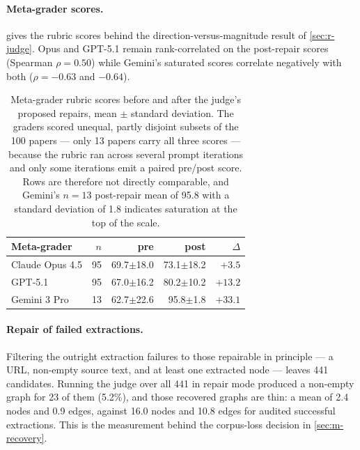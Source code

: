 \documentclass[10pt,twocolumn,letterpaper]{article}
\begin{document}
\paragraph{Meta-grader scores.}  gives the rubric scores behind the
direction-versus-magnitude result of \cref{sec:r-judge}. Opus and GPT-5.1 remain
rank-correlated on the post-repair scores (Spearman $\rho = 0.50$) while Gemini's
saturated scores correlate negatively with both ($\rho = -0.63$ and $-0.64$).

\begin{table}[h]
\centering
\small
\begin{tabular}{lrrrr}
\toprule
\textbf{Meta-grader} & \textbf{$n$} & \textbf{pre} & \textbf{post} & \textbf{$\Delta$} \\
\midrule
Claude Opus 4.5 & 95 & 69.7$\pm$18.0 & 73.1$\pm$18.2 & $+3.5$ \\
GPT-5.1         & 95 & 67.0$\pm$16.2 & 80.2$\pm$10.2 & $+13.2$ \\
Gemini 3 Pro    & 13 & 62.7$\pm$22.6 & 95.8$\pm$1.8  & $+33.1$ \\
\bottomrule
\end{tabular}
\caption{Meta-grader rubric scores before and after the judge's proposed repairs, mean
$\pm$ standard deviation. The graders scored unequal, partly disjoint subsets of the 100
papers --- only 13 papers carry all three scores --- because the rubric ran across
several prompt iterations and only some iterations emit a paired pre/post score. Rows are
therefore not directly comparable, and Gemini's $n{=}13$ post-repair mean of 95.8 with a
standard deviation of 1.8 indicates saturation at the top of the scale.}
\label{tab:graders}
\end{table}

\paragraph{Repair of failed extractions.} Filtering the outright extraction failures to
those repairable in principle --- a URL, non-empty source text, and at least one
extracted node --- leaves 441 candidates. Running the judge over all 441 in repair mode
produced a non-empty graph for 23 of them (5.2\%), and those recovered graphs are thin: a
mean of 2.4 nodes and 0.9 edges, against 16.0 nodes and 10.8 edges for audited successful
extractions. This is the measurement behind the corpus-loss decision in
\cref{sec:m-recovery}.
\end{document}
